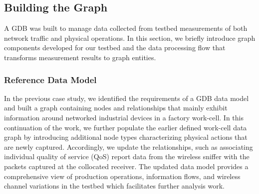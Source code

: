 \subsection{Building the Graph} \label{gdbappl:sec:graph}

A GDB was built to manage data collected from testbed measurements of both network traffic and physical operations.
In this section, we briefly introduce graph components developed for our testbed and the data processing flow that transforms measurement results to graph entities. 

\subsubsection{Reference Data Model}
In the previous case study, we identified the requirements of a GDB data model and built a graph containing nodes and relationships that mainly exhibit information around networked industrial devices in a factory work-cell. In this continuation of the work, we further populate the earlier defined work-cell data graph by introducing additional node types characterizing physical actions that are newly captured. Accordingly, we update the relationships, such as associating individual quality of service (QoS) report data from the wireless sniffer with the packets captured at the collocated receiver. The updated data model provides a comprehensive view of production operations, information flows, and wireless channel variations in the testbed which facilitates further analysis work.  

